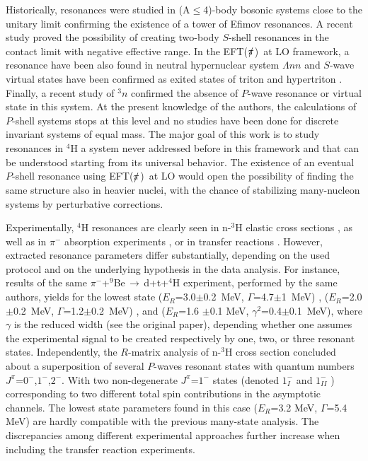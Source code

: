 \documentclass[5p,times]{elsarticle}
\newcommand{\eftnopi}{\mbox{EFT($\slashed{\pi}$) }}
\begin{document}
Historically, resonances were studied in (A$\le$4)-body bosonic systems close to the unitary limit\cite{Deltuva:2012ig,deltuva2020energies} confirming the existence of a tower of Efimov resonances. 
A recent study\cite{Habashi:2020qgw} proved the possibility of creating two-body $S$-shell resonances in the contact limit with negative effective range.%
In the \eftnopi at LO framework, a resonance have been also found in neutral hypernuclear system $\Lambda nn$ \cite{Schafer:2020rba} and $S$-wave virtual states have been confirmed as exited states of triton \cite{Rupak:2019} and hypertriton \cite{Schafer:2020rba}. 
Finally, a recent study of $^3n$ confirmed the absence of $P$-wave resonance or virtual state in this system\cite{Dietz:2021haj}. 
At the present knowledge of the authors, the calculations of $P$-shell systems stops at this level and no studies have been done for discrete invariant systems of equal mass.
The major goal of this work is to study resonances in $^4$H a system never addressed before in this framework and that can be understood starting from its universal behavior. 
The existence of an eventual $P$-shell resonance using \eftnopi at LO would open the possibility of finding the same structure also in heavier nuclei, with the chance of stabilizing many-nucleon systems by perturbative corrections.
%

%
Experimentally, $^4$H resonances are clearly seen in n-$^3$H elastic cross sections \cite{PhysRev.119.1981,SEAGRAVE1972250}, as well as in $\pi^-$ absorption experiments \cite{Sennhauser:1981tr,Gornov:1991fg}, or in transfer reactions \cite{Miljanic:1986zz,Sidorchuk:2003fwa}. 
However, extracted resonance parameters differ substantially, depending on the used protocol and on the underlying hypothesis in the data analysis. 
For instance, results of the same $\pi^-$+$^9$Be$\,\to\,$d+t+$^4$H experiment, performed by the same authors, yields for the lowest state ($E_R$=3.0$\pm$0.2~MeV, $\Gamma$=4.7$\pm$1~MeV) \cite{Gornov:1991fg}, ($E_R$=2.0$\pm$0.2~MeV, $\Gamma$=1.2$\pm$0.2~MeV) \cite{Gurov:2005sp}, and ($E_R$=1.6 $\pm$0.1 MeV, $\gamma^2$=0.4$\pm$0.1~MeV)\cite{Gurov2005p}, where $\gamma$ is the reduced width (see the original paper), depending whether one assumes the experimental signal to be created respectively by one, two, or three resonant states.
Independently, the $R$-matrix analysis of n-$^3$H cross section \cite{Tilley:1992zz} concluded about a superposition of several $P$-waves resonant states with quantum numbers $J^\pi$=$0^-$,$1^-$,$2^-$. 
With two non-degenerate $J^\pi$=$1^-$ states (denoted $1^-_I$ and $1^-_{II}$ ) corresponding to two different total spin contributions in the asymptotic channels\cite{Lazauskas:2004uq}. 
The lowest state parameters found in this case ($E_R$=3.2 MeV, $\Gamma$=5.4 MeV) are hardly compatible with the previous many-state analysis. 
The discrepancies among different experimental approaches further
increase when including the transfer reaction experiments.
%
\end{document}
